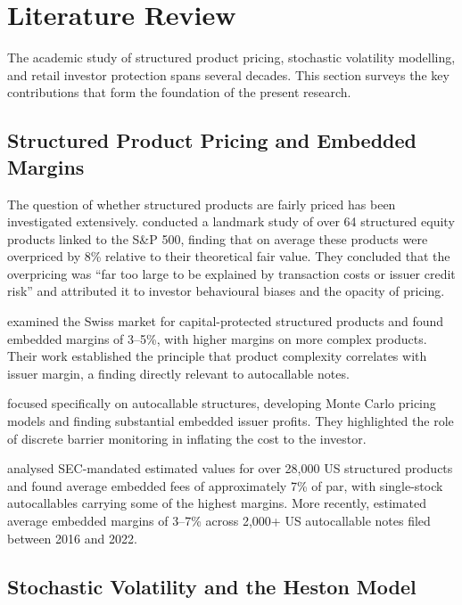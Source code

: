 \documentclass[12pt,a4paper]{article}
\begin{document}
\section{Literature Review}
\label{sec:literature}

The academic study of structured product pricing, stochastic volatility modelling, and retail investor protection spans several decades. This section surveys the key contributions that form the foundation of the present research.

\subsection{Structured Product Pricing and Embedded Margins}

The question of whether structured products are fairly priced has been investigated extensively. \citet{henderson2011} conducted a landmark study of over 64 structured equity products linked to the S\&P 500, finding that on average these products were overpriced by 8\% relative to their theoretical fair value. They concluded that the overpricing was ``far too large to be explained by transaction costs or issuer credit risk'' and attributed it to investor behavioural biases and the opacity of pricing.

\citet{wallmeier2009} examined the Swiss market for capital-protected structured products and found embedded margins of 3--5\%, with higher margins on more complex products. Their work established the principle that product complexity correlates with issuer margin, a finding directly relevant to autocallable notes.

\citet{deng2011} focused specifically on autocallable structures, developing Monte Carlo pricing models and finding substantial embedded issuer profits. They highlighted the role of discrete barrier monitoring in inflating the cost to the investor.

\citet{vokata2021} analysed SEC-mandated estimated values for over 28,000 US structured products and found average embedded fees of approximately 7\% of par, with single-stock autocallables carrying some of the highest margins. More recently, \citet{celiere2023} estimated average embedded margins of 3--7\% across 2,000+ US autocallable notes filed between 2016 and 2022.

\subsection{Stochastic Volatility and the Heston Model}
\end{document}
